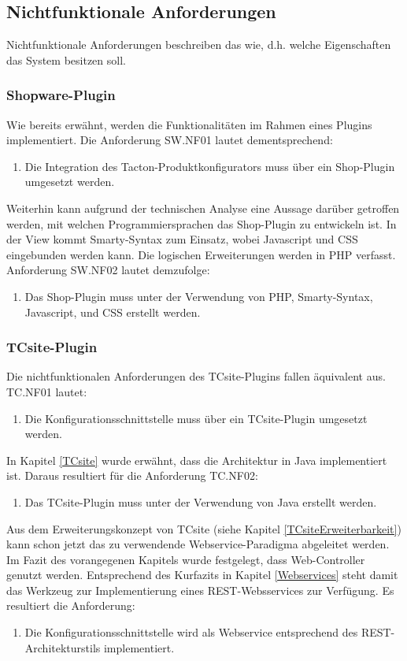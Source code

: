 \documentclass[11pt, a4paper, titlepage, listof=totoc, bibliography=totoc, index=totoc, twoside, openright, headings=normal, draft]{scrreprt}
\begin{document}
\subsection{Nichtfunktionale Anforderungen}
Nichtfunktionale Anforderungen beschreiben das \glqq wie\grqq{}, d.h. welche Eigenschaften das System besitzen soll.

\subsubsection{Shopware-Plugin}
Wie bereits erwähnt, werden die Funktionalitäten im Rahmen eines Plugins implementiert. Die Anforderung SW.NF01 lautet dementsprechend:
\begin{enumerate}[SW.NF01:]\bfseries
\item Die Integration des Tacton-Produktkonfigurators muss über ein Shop-Plugin umgesetzt werden.
\end{enumerate}
Weiterhin kann aufgrund der technischen Analyse eine Aussage darüber getroffen werden, mit welchen Programmiersprachen das Shop-Plugin zu entwickeln ist. In der View kommt Smarty-Syntax zum Einsatz, wobei Javascript und CSS eingebunden werden kann. Die logischen Erweiterungen werden in PHP verfasst. Anforderung SW.NF02 lautet demzufolge:
\begin{enumerate}[SW.NF02:]\bfseries
\item Das Shop-Plugin muss unter der Verwendung von PHP, Smarty-Syntax, Javascript, und CSS erstellt werden.
\end{enumerate}

\subsubsection{TCsite-Plugin}
Die nichtfunktionalen Anforderungen des TCsite-Plugins fallen äquivalent aus. TC.NF01 lautet:
\begin{enumerate}[TC.NF01:]\bfseries
\item Die Konfigurationsschnittstelle muss über ein TCsite-Plugin umgesetzt werden.
\end{enumerate}
In Kapitel \ref{TCsite} wurde erwähnt, dass die Architektur in Java implementiert ist. Daraus resultiert für die Anforderung TC.NF02:
\begin{enumerate}[TC.NF02:]\bfseries
\item Das TCsite-Plugin muss unter der Verwendung von Java erstellt werden.
\end{enumerate}
Aus dem Erweiterungskonzept von TCsite (siehe Kapitel \ref{TCsiteErweiterbarkeit})
 kann schon jetzt das zu verwendende Webservice-Paradigma abgeleitet werden. Im Fazit des vorangegenen Kapitels wurde festgelegt, dass Web-Controller genutzt werden. Entsprechend des Kurfazits in Kapitel \ref{Webservices} steht damit das Werkzeug zur Implementierung eines REST-Websservices zur Verfügung. Es resultiert die Anforderung:
\begin{enumerate}[TC.NF03:]\bfseries
\item Die Konfigurationsschnittstelle wird als Webservice entsprechend des REST-Architekturstils implementiert.
\end{enumerate}
\end{document}
